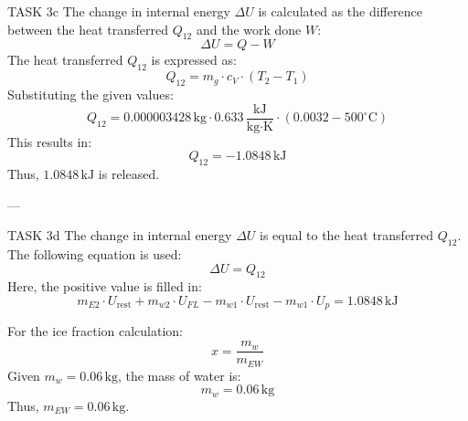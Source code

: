 TASK 3c  
The change in internal energy \( \Delta U \) is calculated as the difference between the heat transferred \( Q_{12} \) and the work done \( W \):  
\[
\Delta U = Q - W
\]  
The heat transferred \( Q_{12} \) is expressed as:  
\[
Q_{12} = m_g \cdot c_V \cdot (T_2 - T_1)
\]  
Substituting the given values:  
\[
Q_{12} = 0.000003428 \, \text{kg} \cdot 0.633 \, \frac{\text{kJ}}{\text{kg·K}} \cdot (0.0032 - 500^\circ\text{C})
\]  
This results in:  
\[
Q_{12} = -1.0848 \, \text{kJ}
\]  
Thus, \( 1.0848 \, \text{kJ} \) is released.

---

TASK 3d  
The change in internal energy \( \Delta U \) is equal to the heat transferred \( Q_{12} \). The following equation is used:  
\[
\Delta U = Q_{12}
\]  
Here, the positive value is filled in:  
\[
m_{E2} \cdot U_{\text{rest}} + m_{w2} \cdot U_{FL} - m_{w1} \cdot U_{\text{rest}} - m_{w1} \cdot U_p = 1.0848 \, \text{kJ}
\]  

For the ice fraction calculation:  
\[
x = \frac{m_w}{m_{EW}}
\]  
Given \( m_w = 0.06 \, \text{kg} \), the mass of water is:  
\[
m_w = 0.06 \, \text{kg}
\]  
Thus, \( m_{EW} = 0.06 \, \text{kg} \).